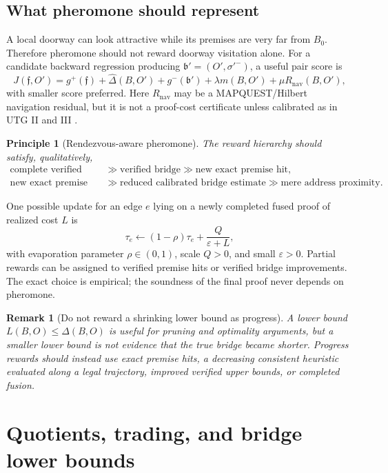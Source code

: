 \documentclass[11pt]{article}
\newtheorem{remark}[definition]{Remark}
\newtheorem{principle}[definition]{Principle}
\begin{document}
\subsection{What pheromone should represent}
A local doorway can look attractive while its premises are very far from $B_0$. Therefore pheromone should not reward doorway visitation alone. For a candidate backward regression producing $\mathfrak b'=(O',\sigma'^-)$, a useful pair score is
\begin{equation}
J(\mathfrak f,O')
=
 g^+(\mathfrak f)
 + \widehat\Delta(B,O')
 + g^-(\mathfrak b')
 + \lambda m(B,O')
 + \mu R_{\mathrm{nav}}(B,O'),
\end{equation}
with smaller score preferred. Here $R_{\mathrm{nav}}$ may be a MAPQUEST/Hilbert navigation residual, but it is not a proof-cost certificate unless calibrated as in UTG II and III \cite{UTGII,UTGIII}.

\begin{principle}[Rendezvous-aware pheromone]
The reward hierarchy should satisfy, qualitatively,
\begin{align*}
\text{complete verified fusion}
&\gg \text{verified bridge}
\gg \text{new exact premise hit},\\
\text{new exact premise hit}
&\gg \text{reduced calibrated bridge estimate}
\gg \text{mere address proximity}.
\end{align*}
\end{principle}

One possible update for an edge $e$ lying on a newly completed fused proof of realized cost $L$ is
\[
\tau_e\leftarrow(1-\rho)\tau_e + \frac{Q}{\varepsilon+L},
\]
with evaporation parameter $\rho\in(0,1)$, scale $Q>0$, and small $\varepsilon>0$. Partial rewards can be assigned to verified premise hits or verified bridge improvements. The exact choice is empirical; the soundness of the final proof never depends on pheromone.

\begin{remark}[Do not reward a shrinking lower bound as progress]
A lower bound $L(B,O)\le\Delta(B,O)$ is useful for pruning and optimality arguments, but a smaller lower bound is not evidence that the true bridge became shorter. Progress rewards should instead use exact premise hits, a decreasing consistent heuristic evaluated along a legal trajectory, improved verified upper bounds, or completed fusion.
\end{remark}

\section{Quotients, trading, and bridge lower bounds}
\end{document}
